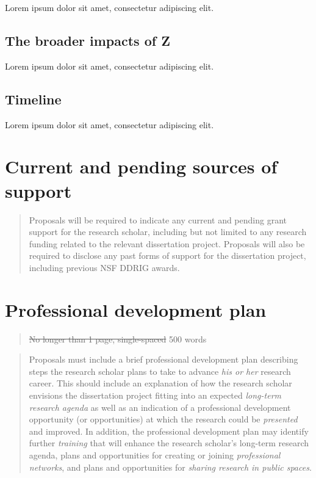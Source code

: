 \documentclass[
      12pt,
        ]{article}
\begin{document}
Lorem ipsum dolor sit amet, consectetur adipiscing elit.

\hypertarget{the-broader-impacts-of-z}{%
\subsection{The broader impacts of Z}\label{the-broader-impacts-of-z}}

Lorem ipsum dolor sit amet, consectetur adipiscing elit.

\hypertarget{timeline}{%
\subsection{Timeline}\label{timeline}}

Lorem ipsum dolor sit amet, consectetur adipiscing elit.

\newpage

\hypertarget{current-and-pending-sources-of-support}{%
\section{Current and pending sources of support}\label{current-and-pending-sources-of-support}}

\begin{quote}
Proposals will be required to indicate any current and pending grant support for the research scholar, including but not limited to any research funding related to the relevant dissertation project. Proposals will also be required to disclose any past forms of support for the dissertation project, including previous NSF DDRIG awards.
\end{quote}

\newpage

\hypertarget{professional-development-plan}{%
\section{Professional development plan}\label{professional-development-plan}}

\begin{quote}
\sout{No longer than 1 page, single-spaced} 500 words
\end{quote}

\begin{quote}
Proposals must include a brief professional development plan describing steps the research scholar plans to take to advance \emph{his or her} research career. This should include an explanation of how the research scholar envisions the dissertation project fitting into an expected \emph{long-term research agenda} as well as an indication of a professional development opportunity (or opportunities) at which the research could be \emph{presented} and improved. In addition, the professional development plan may identify further \emph{training} that will enhance the research scholar's long-term research agenda, plans and opportunities for creating or joining \emph{professional networks}, and plans and opportunities for \emph{sharing research in public spaces}.
\end{quote}
\end{document}
